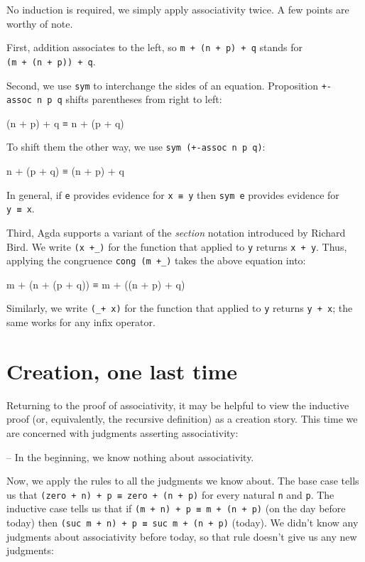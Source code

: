 No induction is required, we simply apply associativity twice. A few
points are worthy of note.

First, addition associates to the left, so
\texttt{m\ +\ (n\ +\ p)\ +\ q} stands for
\texttt{(m\ +\ (n\ +\ p))\ +\ q}.

Second, we use \texttt{sym} to interchange the sides of an equation.
Proposition \texttt{+-assoc\ n\ p\ q} shifts parentheses from right to
left:

\begin{myDisplay}
(n + p) + q ≡ n + (p + q)
\end{myDisplay}

To shift them the other way, we use \texttt{sym\ (+-assoc\ n\ p\ q)}:

\begin{myDisplay}
n + (p + q) ≡ (n + p) + q
\end{myDisplay}

In general, if \texttt{e} provides evidence for \texttt{x\ ≡\ y} then
\texttt{sym\ e} provides evidence for \texttt{y\ ≡\ x}.

Third, Agda supports a variant of the \emph{section} notation introduced
by Richard Bird. We write \texttt{(x\ +\_)} for the function that
applied to \texttt{y} returns \texttt{x\ +\ y}. Thus, applying the
congruence \texttt{cong\ (m\ +\_)} takes the above equation into:

\begin{myDisplay}
m + (n + (p + q)) ≡ m + ((n + p) + q)
\end{myDisplay}

Similarly, we write \texttt{(\_+\ x)} for the function that applied to
\texttt{y} returns \texttt{y\ +\ x}; the same works for any infix
operator.

\hypertarget{creation-one-last-time}{%
\section{Creation, one last time}\label{creation-one-last-time}}

Returning to the proof of associativity, it may be helpful to view the
inductive proof (or, equivalently, the recursive definition) as a
creation story. This time we are concerned with judgments asserting
associativity:

\begin{myDisplay}
 -- In the beginning, we know nothing about associativity.
\end{myDisplay}

Now, we apply the rules to all the judgments we know about. The base
case tells us that \texttt{(zero\ +\ n)\ +\ p\ ≡\ zero\ +\ (n\ +\ p)}
for every natural \texttt{n} and \texttt{p}. The inductive case tells us
that if \texttt{(m\ +\ n)\ +\ p\ ≡\ m\ +\ (n\ +\ p)} (on the day before
today) then \texttt{(suc\ m\ +\ n)\ +\ p\ ≡\ suc\ m\ +\ (n\ +\ p)}
(today). We didn't know any judgments about associativity before today,
so that rule doesn't give us any new judgments:


